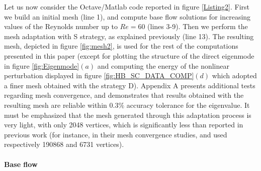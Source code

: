 \documentclass[twocolumn,10pt]{asme2ej}
\begin{document}
Let us now consider the Octave/Matlab code reported in figure \ref{Listing2}. First we build an initial mesh (line 1), and compute base flow solutions for increasing values of the Reynolds number up to $Re = 60$ (lines 3-9).
Then we perform the mesh adaptation with S strategy, as explained previously (line 13).
The resulting mesh, depicted in figure \ref{fig:mesh2}, is used for the rest of the computations presented in this paper (except for plotting the structure of the direct eigenmode in figure \ref{fig:Eigenmode}$(a)$ and computing the energy of the nonlinear perturbation displayed in figure \ref{fig:HB_SC_DATA_COMP}$(d)$ which adopted a finer mesh obtained with the strategy D). 
Appendix A presents additional tests regarding mesh convergence, and demonstrates that results obtained with the resulting mesh are reliable within $0.3\%$ accuracy tolerance for the eigenvalue. It must be emphasized  that the mesh generated through this adaptation process is very light, with only 2048 vertices, which is significantly less than reported in previous work (for instance, in their mesh convergence studies, \cite{SippLebedev} and \cite{MLugo2014} used respectively 190868  and 6731 vertices).










\paragraph{Base flow}
\end{document}
